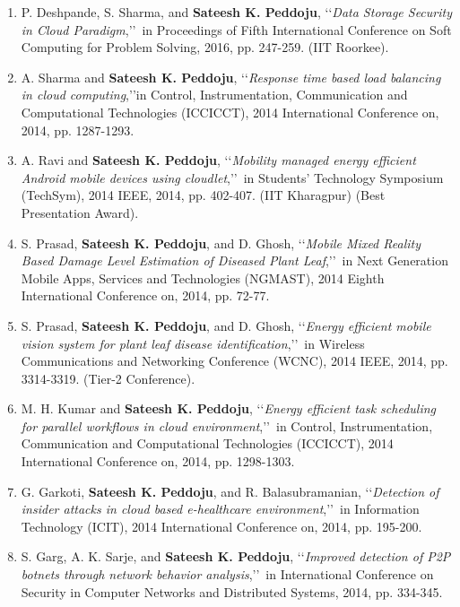 \begin{enumerate}[label=(C\arabic*).]
	\item
	P. Deshpande, S. Sharma, and \textbf{Sateesh K. Peddoju}, \lq\lq \textit{Data Storage Security in Cloud Paradigm},\rq\rq\, in Proceedings of Fifth International Conference on Soft Computing for Problem Solving, 2016, pp. 247-259.  (IIT Roorkee).
	
	\item
	A. Sharma and \textbf{Sateesh K. Peddoju}, \lq\lq \textit{Response time based load balancing in cloud computing},\rq\rq in Control, Instrumentation, Communication and Computational Technologies (ICCICCT), 2014 International Conference on, 2014, pp. 1287-1293.
	
	\item
	A. Ravi and \textbf{Sateesh K. Peddoju}, \lq\lq \textit{Mobility managed energy efficient Android mobile devices using cloudlet},\rq\rq\, in Students' Technology Symposium (TechSym), 2014 IEEE, 2014, pp. 402-407. (IIT Kharagpur) (Best Presentation Award).
	\item
	S. Prasad, \textbf{Sateesh K. Peddoju}, and D. Ghosh, \lq\lq \textit{Mobile Mixed Reality Based Damage Level Estimation of Diseased Plant Leaf},\rq\rq\, in Next Generation Mobile Apps, Services and Technologies (NGMAST), 2014 Eighth International Conference on, 2014, pp. 72-77.
	
	\item
	S. Prasad, \textbf{Sateesh K. Peddoju}, and D. Ghosh, \lq\lq \textit{Energy efficient mobile vision system for plant leaf disease identification},\rq\rq\, in Wireless Communications and Networking Conference (WCNC), 2014 IEEE, 2014, pp. 3314-3319. (Tier-2 Conference).
	
	\item
	M. H. Kumar and \textbf{Sateesh K. Peddoju}, \lq\lq \textit{Energy efficient task scheduling for parallel workflows in cloud environment},\rq\rq\, in Control, Instrumentation, Communication and Computational Technologies (ICCICCT), 2014 International Conference on, 2014, pp. 1298-1303.
	
	\item
	G. Garkoti, \textbf{Sateesh K. Peddoju}, and R. Balasubramanian, \lq\lq \textit{Detection of insider attacks in cloud based e-healthcare environment},\rq\rq\, in Information Technology (ICIT), 2014 International Conference on, 2014, pp. 195-200.
	
	\item
	S. Garg, A. K. Sarje, and \textbf{Sateesh K. Peddoju}, \lq\lq \textit{Improved detection of P2P botnets through network behavior analysis},\rq\rq\, in International Conference on Security in Computer Networks and Distributed Systems, 2014, pp. 334-345.
	

\end{enumerate}
